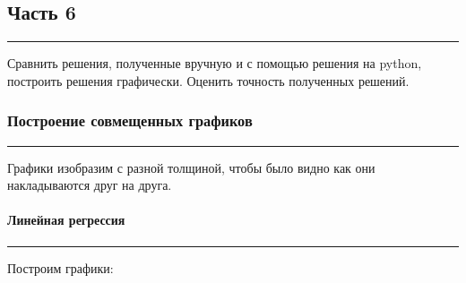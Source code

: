 \documentclass[a4paper, 14pt]{extarticle}
\begin{document}




\subsection*{{Часть 6}}\vspace{-20pt}\rule{\linewidth}{0.1mm}

Сравнить решения, полученные вручную и с помощью решения на python, построить решения графически.  
Оценить точность полученных решений.

\subsubsection*{{Построение совмещенных графиков}}\vspace{-20pt}\rule{\linewidth}{0.1mm}

Графики изобразим с разной толщиной, чтобы было видно как они накладываются друг на друга.

\paragraph*{{Линейная регрессия}}\vspace{-20pt}\rule{\linewidth}{0.1mm}

Построим графики:
\end{document}
